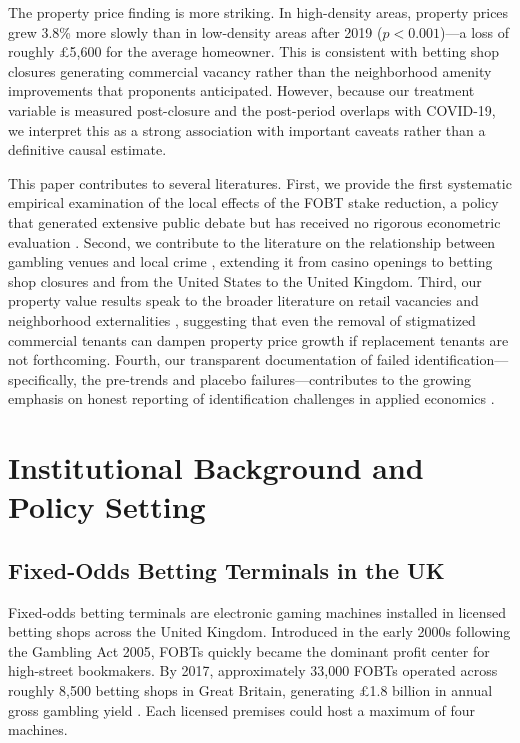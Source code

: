 \documentclass[12pt]{article}
\begin{document}
The property price finding is more striking. In high-density areas, property prices grew 3.8\% more slowly than in low-density areas after 2019 ($p < 0.001$)---a loss of roughly \pounds5,600 for the average homeowner. This is consistent with betting shop closures generating commercial vacancy rather than the neighborhood amenity improvements that proponents anticipated. However, because our treatment variable is measured post-closure and the post-period overlaps with COVID-19, we interpret this as a strong association with important caveats rather than a definitive causal estimate.

This paper contributes to several literatures. First, we provide the first systematic empirical examination of the local effects of the FOBT stake reduction, a policy that generated extensive public debate but has received no rigorous econometric evaluation \citep{dcms2018review}. Second, we contribute to the literature on the relationship between gambling venues and local crime \citep{grinols2004, wheeler2011, reece2010}, extending it from casino openings to betting shop closures and from the United States to the United Kingdom. Third, our property value results speak to the broader literature on retail vacancies and neighborhood externalities \citep{autor2014, diamond2019}, suggesting that even the removal of stigmatized commercial tenants can dampen property price growth if replacement tenants are not forthcoming. Fourth, our transparent documentation of failed identification---specifically, the pre-trends and placebo failures---contributes to the growing emphasis on honest reporting of identification challenges in applied economics \citep{roth2023, rambachan2023}.


\section{Institutional Background and Policy Setting}
\label{sec:background}

\subsection{Fixed-Odds Betting Terminals in the UK}

Fixed-odds betting terminals are electronic gaming machines installed in licensed betting shops across the United Kingdom. Introduced in the early 2000s following the Gambling Act 2005, FOBTs quickly became the dominant profit center for high-street bookmakers. By 2017, approximately 33,000 FOBTs operated across roughly 8,500 betting shops in Great Britain, generating \pounds1.8 billion in annual gross gambling yield \citep{gamblingcommission2018}. Each licensed premises could host a maximum of four machines.
\end{document}
